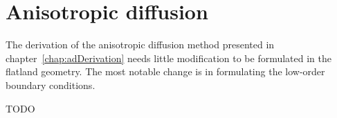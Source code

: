 \section{Anisotropic diffusion}
The derivation of the anisotropic diffusion method presented in
chapter~\ref{chap:adDerivation} needs little modification to be formulated
in the flatland geometry. The most notable change is in formulating the
low-order boundary conditions.

TODO

%
%
